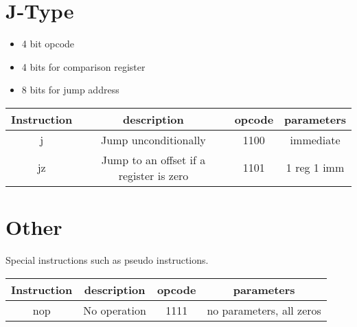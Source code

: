 \documentclass[a4paper]{article}
\begin{document}
\section{J-Type}

\begin{itemize}
\item 4 bit opcode
\item 4 bits for comparison register
\item 8 bits for jump address
\end{itemize}

\begin{center}
\begin{tabular}{| c | c | c | c |}
\hline
Instruction & description & opcode & parameters \\ \hline
j & Jump unconditionally & 1100 & immediate \\ \hline
jz & Jump to an offset if a register is zero & 1101 & 1 reg 1 imm \\ \hline
\end{tabular}
\end{center}


\section{Other}
Special instructions such as pseudo instructions.


\begin{center}
\begin{tabular}{| c | c | c | c |}
\hline
Instruction & description & opcode & parameters \\ \hline
nop & No operation & 1111 & no parameters, all zeros\\ \hline
\end{tabular}
\end{center}
\end{document}
